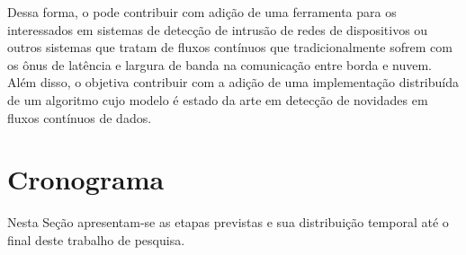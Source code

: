 Dessa forma, o \mfog pode contribuir com adição de uma ferramenta para os interessados
em sistemas de detecção de intrusão de redes de dispositivos \iot
ou outros sistemas que tratam de fluxos contínuos que tradicionalmente sofrem
com os ônus de latência e largura de banda na comunicação entre borda e nuvem.
Além disso, o \mfog objetiva contribuir com a adição de uma implementação
distribuída de um algoritmo cujo modelo é estado da arte em detecção de
novidades em fluxos contínuos de dados.


\section{Cronograma}\label{sec:crono}

Nesta Seção apresentam-se as etapas previstas e sua distribuição temporal até o
final deste trabalho de pesquisa.


